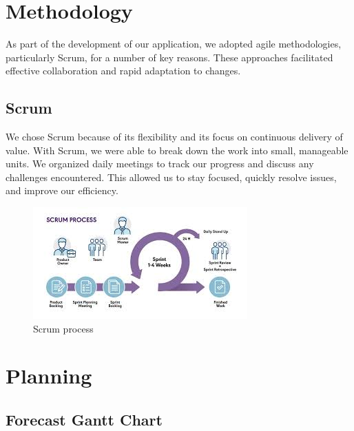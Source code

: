 \documentclass[12pt,a4paper,table,english]{article}
\begin{document}
	\pagebreak
	\section{Methodology}
	
	As part of the development of our application, we adopted agile methodologies, particularly Scrum, for a number of key reasons. These approaches facilitated effective collaboration and rapid adaptation to changes.
	
	\subsection{Scrum}
	We chose Scrum\citep{SCRUM} because of its flexibility and its focus on continuous delivery of value. With Scrum, we were able to break down the work into small, manageable units. We organized daily meetings to track our progress and discuss any challenges encountered. This allowed us to stay focused, quickly resolve issues, and improve our efficiency.
	
	\begin{figure}[h!]
		\centering
		\includegraphics{Image/scrum}
		\caption{Scrum process}
		\label{fig:Scrum process}
	\end{figure}

	\pagebreak
	
	\section{Planning}
	
	\subsection{Forecast Gantt Chart}
	
\end{document}
